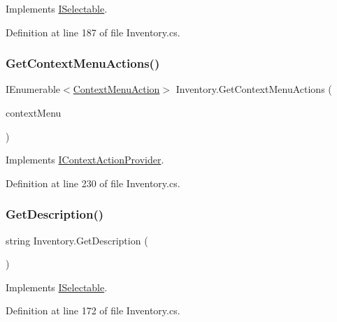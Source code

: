 Implements \hyperlink{interface_i_selectable_a337f81bfa99bb254bb2f7de6a8b5cd4b}{I\+Selectable}.



Definition at line 187 of file Inventory.\+cs.

\mbox{\label{class_inventory_aa7f9e191f5d4e2cdb012d3de59f2eacf}} 
\subsubsection{\texorpdfstring{Get\+Context\+Menu\+Actions()}{GetContextMenuActions()}}
{\footnotesize\ttfamily I\+Enumerable$<$\hyperlink{class_context_menu_action}{Context\+Menu\+Action}$>$ Inventory.\+Get\+Context\+Menu\+Actions (\begin{DoxyParamCaption}\item[{\hyperlink{class_context_menu}{Context\+Menu}}]{context\+Menu }\end{DoxyParamCaption})}



Implements \hyperlink{interface_i_context_action_provider_acb23b31fd7720af55c607a3c12634d1e}{I\+Context\+Action\+Provider}.



Definition at line 230 of file Inventory.\+cs.

\mbox{\label{class_inventory_abd4b4e47544f6697bcec6fea62b80fe2}} 
\subsubsection{\texorpdfstring{Get\+Description()}{GetDescription()}}
{\footnotesize\ttfamily string Inventory.\+Get\+Description (\begin{DoxyParamCaption}{ }\end{DoxyParamCaption})}



Implements \hyperlink{interface_i_selectable_a1d8947a443b6214cff01f2d75c8bc75a}{I\+Selectable}.



Definition at line 172 of file Inventory.\+cs.

